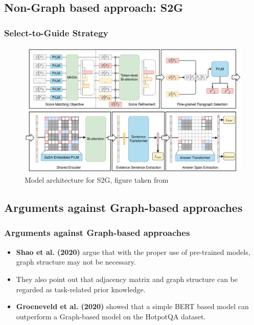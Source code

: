 \documentclass[10pt]{beamer}
\begin{document}
\subsection{Non-Graph based approach: S2G}

\begin{frame}
  \frametitle{Select-to-Guide Strategy}

  \begin{figure}[t] %
    \centering
    \includegraphics[width=\linewidth]{fig/ext_fig/s2g_diagram.png} %
    \caption{Model architecture for S2G, figure taken from \cite{RN106}}
    \label{fig:sample_hotpotqa} %
  \end{figure}

\end{frame}

\subsection{Arguments against Graph-based approaches}

\begin{frame}
  \frametitle{Arguments against Graph-based approaches}
  \begin{itemize}
    \item \textbf{Shao et al. (2020)} \cite{RN127} argue that with the proper use of pre-trained models, graph structure may not be necessary.
    \item They also point out that adjacency matrix and graph structure can be regarded as task-related prior knowledge.
    \item \textbf{Groeneveld et al. (2020)} \cite{RN126} showed that a simple BERT based model can outperform a Graph-based model on the HotpotQA dataset.
  \end{itemize}

\end{frame}
\end{document}
